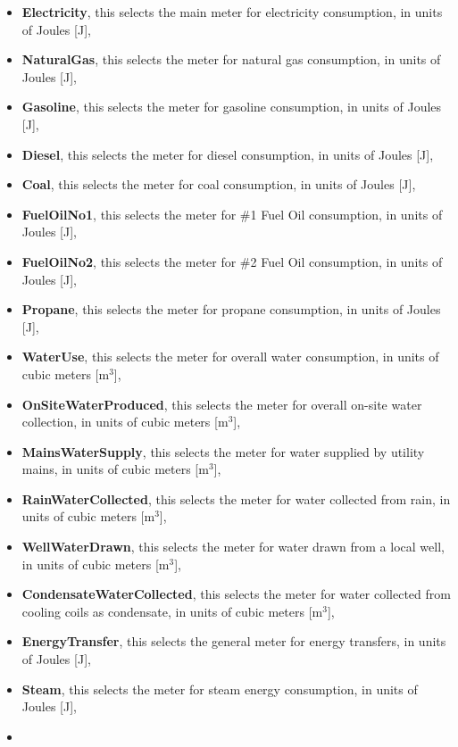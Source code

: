 \begin{itemize}
\item
  \textbf{Electricity}, this selects the main meter for electricity consumption, in units of Joules {[}J{]},
\item
  \textbf{NaturalGas}, this selects the meter for natural gas consumption, in units of Joules {[}J{]},
\item
  \textbf{Gasoline}, this selects the meter for gasoline consumption, in units of Joules {[}J{]},
\item
  \textbf{Diesel}, this selects the meter for diesel consumption, in units of Joules {[}J{]},
\item
  \textbf{Coal}, this selects the meter for coal consumption, in units of Joules {[}J{]},
\item
  \textbf{FuelOilNo1}, this selects the meter for \#1 Fuel Oil consumption, in units of Joules {[}J{]},
\item
  \textbf{FuelOilNo2}, this selects the meter for \#2 Fuel Oil consumption, in units of Joules {[}J{]},
\item
  \textbf{Propane}, this selects the meter for propane consumption, in units of Joules {[}J{]},
\item
  \textbf{WaterUse}, this selects the meter for overall water consumption, in units of cubic meters {[}m\(^{3}\){]},
\item
  \textbf{OnSiteWaterProduced}, this selects the meter for overall on-site water collection, in units of cubic meters {[}m\(^{3}\){]},
\item
  \textbf{MainsWaterSupply}, this selects the meter for water supplied by utility mains, in units of cubic meters {[}m\(^{3}\){]},
\item
  \textbf{RainWaterCollected}, this selects the meter for water collected from rain, in units of cubic meters {[}m\(^{3}\){]},
\item
  \textbf{WellWaterDrawn}, this selects the meter for water drawn from a local well, in units of cubic meters {[}m\(^{3}\){]},
\item
  \textbf{CondensateWaterCollected}, this selects the meter for water collected from cooling coils as condensate, in units of cubic meters {[}m\(^{3}\){]},
\item
  \textbf{EnergyTransfer}, this selects the general meter for energy transfers, in units of Joules {[}J{]},
\item
  \textbf{Steam}, this selects the meter for steam energy consumption, in units of Joules {[}J{]},
\item

\end{itemize}
